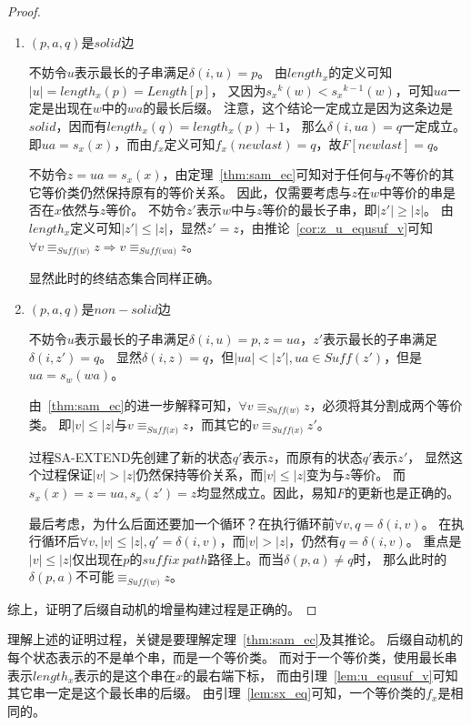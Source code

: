 \documentclass[UTF8]{ctexart}
\theoremstyle{definition}
\theoremstyle{remark}
\numberwithin{equation}{subsection}
\newcommand{\equsuf}[1][x]{\equiv_{\textit{Suff(#1)}}}
\newcommand{\Suff}{\textit{Suff}}
\begin{document}
\begin{proof}
\begin{enumerate}
			\item $(p, a, q)$是$solid$边
			
			不妨令$u$表示最长的子串满足$\delta(i, u) = p$。
			由$length_x$的定义可知$|u| = length_x(p) = Length[p]$，
			又因为${s_x}^k(w) < {s_x}^{k-1}(w)$，可知$ua$一定是出现在$w$中的$wa$的最长后缀。
			注意，这个结论一定成立是因为这条边是$solid$，因而有$length_x(q) = length_x(p) + 1$，
			那么$\delta(i, ua) = q$一定成立。
			即$ua = s_x(x)$，而由$f_x$定义可知$f_x(newlast) = q$，故$F[newlast] = q$。
			
			不妨令$z = ua = s_x(x)$，由定理~\ref{thm:sam_ec}可知对于任何与$q$不等价的其它等价类仍然保持原有的等价关系。
			因此，仅需要考虑与$z$在$w$中等价的串是否在$x$依然与$z$等价。
			不妨令$z'$表示$w$中与$z$等价的最长子串，即$|z'| \ge |z|$。
			由$length_x$定义可知$|z'| \le |z|$，显然$z' = z$，由推论~\ref{cor:z_u_equsuf_v}可知
			$\forall v \equsuf[w] z \Longrightarrow v \equsuf[wa] z$。
			
			显然此时的终结态集合同样正确。
			
			\item $(p, a, q)$是$non-solid$边
			
			不妨令$u$表示最长的子串满足$\delta(i, u) = p, z = ua$，$z'$表示最长的子串满足$\delta(i, z') = q$。
			显然$\delta(i, z) = q$，但$|ua| < |z'|, ua \in \Suff(z')$，但是$ua = s_w(wa)$。
			
			由~\ref{thm:sam_ec}的进一步解释可知，$\forall v \equsuf[w] z$，必须将其分割成两个等价类。
			即$|v| \le |z|$与$v \equsuf[x] z$，而其它的$v \equsuf[x] z'$。
			
			过程SA-EXTEND先创建了新的状态$q'$表示$z$，而原有的状态$q'$表示$z'$，
			显然这个过程保证$|v| > |z|$仍然保持等价关系，而$|v| \le |z|$变为与$z$等价。
			而$s_x(x) = z = ua, s_x(z') = z$均显然成立。因此，易知$F$的更新也是正确的。
			
			最后考虑，为什么后面还要加一个循环？在执行循环前$\forall v, q = \delta(i, v)$。
			在执行循环后$\forall v, |v| \le |z|, q' = \delta(i, v)$，而$|v| > |z|$，仍然有$q = \delta(i, v)$。
			重点是$|v| \le |z|$仅出现在$p$的$suffix\ path$路径上。而当$\delta(p,a) \neq q$时，
			那么此时的$\delta(p,a)$不可能$\equsuf[w] z$。
			
		\end{enumerate}
		
		综上，证明了后缀自动机的增量构建过程是正确的。
	\end{proof}
	理解上述的证明过程，关键是要理解定理~\ref{thm:sam_ec}及其推论。
	后缀自动机的每个状态表示的不是单个串，而是一个等价类。
	而对于一个等价类，使用最长串表示$length_x$表示的是这个串在$x$的最右端下标，
	而由引理~\ref{lem:u_equsuf_v}可知其它串一定是这个最长串的后缀。
	由引理~\ref{lem:sx_eq}可知，一个等价类的$f_x$是相同的。
		
\end{document}
